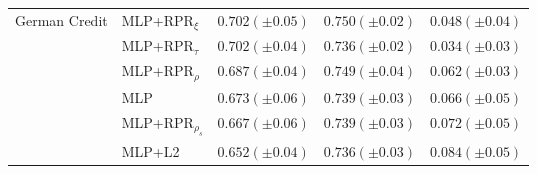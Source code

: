 \begin{tabular}{lllll}
\multirow[t]{6}{*}{German Credit} & MLP+RPR$_{\xi}$ & $0.702 (\pm0.05)$ & $0.750 (\pm0.02)$ & $0.048 (\pm0.04)$ \\
 & MLP+RPR$_{\tau}$ & $0.702 (\pm0.04)$ & $0.736 (\pm0.02)$ & $0.034 (\pm0.03)$ \\
 & MLP+RPR$_{\rho}$ & $0.687 (\pm0.04)$ & $0.749 (\pm0.04)$ & $0.062 (\pm0.03)$ \\
 & MLP & $0.673 (\pm0.06)$ & $0.739 (\pm0.03)$ & $0.066 (\pm0.05)$ \\
 & MLP+RPR$_{\rho_s}$ & $0.667 (\pm0.06)$ & $0.739 (\pm0.03)$ & $0.072 (\pm0.05)$ \\
 & MLP+L2 & $0.652 (\pm0.04)$ & $0.736 (\pm0.03)$ & $0.084 (\pm0.05)$ \\
\cline{1-5}
\bottomrule
\end{tabular}
